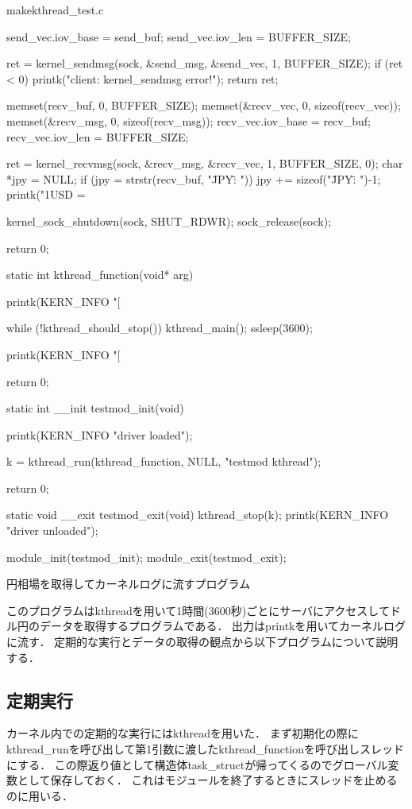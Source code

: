 \begin{longlisting}
\begin{myminted}{make}{kthread_test.c}
{    send_vec.iov_base = send_buf;
    send_vec.iov_len = BUFFER_SIZE;

    ret = kernel_sendmsg(sock, &send_msg, &send_vec, 1, BUFFER_SIZE);
    if (ret < 0) {
        printk("client: kernel_sendmsg error!\n");
        return ret;
    }

    memset(recv_buf, 0, BUFFER_SIZE);
    memset(&recv_vec, 0, sizeof(recv_vec));
    memset(&recv_msg, 0, sizeof(recv_msg));
    recv_vec.iov_base = recv_buf;
    recv_vec.iov_len = BUFFER_SIZE;

    ret = kernel_recvmsg(sock, &recv_msg, &recv_vec, 1, BUFFER_SIZE, 0);
    char *jpy = NULL;
    if (jpy = strstr(recv_buf, "\"JPY\": ")) {
        jpy += sizeof("\"JPY\": ")-1;
    }
    printk("1USD = %

    kernel_sock_shutdown(sock, SHUT_RDWR);
    sock_release(sock);

    return 0;
}

static int kthread_function(void* arg) {
    printk(KERN_INFO "[%

    while (!kthread_should_stop()) {
        kthread_main();
        ssleep(3600);
    }

    printk(KERN_INFO "[%

    return 0;
}

static int __init testmod_init(void) {
    printk(KERN_INFO "driver loaded\n");

    k = kthread_run(kthread_function, NULL, "testmod kthread");

    return 0;
}

static void __exit testmod_exit(void) {
    kthread_stop(k);
    printk(KERN_INFO "driver unloaded\n");
}

module_init(testmod_init);
module_exit(testmod_exit);
\end{myminted}
\caption{円相場を取得してカーネルログに流すプログラム}
\label{lst:rate}
\end{longlisting}

このプログラムはkthreadを用いて1時間(3600秒)ごとにサーバにアクセスしてドル円のデータを取得するプログラムである．
出力はprintkを用いてカーネルログに流す．
定期的な実行とデータの取得の観点から以下プログラムについて説明する．

\subsection{定期実行}
カーネル内での定期的な実行にはkthreadを用いた．
まず初期化の際にkthread_runを呼び出して第1引数に渡したkthread_functionを呼び出しスレッドにする．
この際返り値として構造体task_structが帰ってくるのでグローバル変数として保存しておく．
これはモジュールを終了するときにスレッドを止めるのに用いる．

